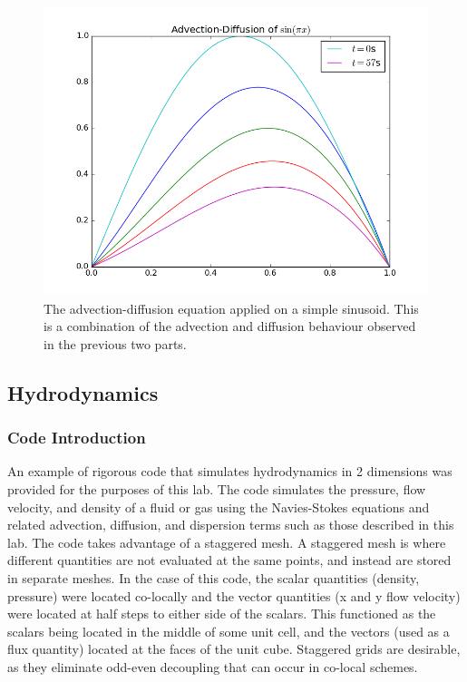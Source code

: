 \documentclass[twocolumn]{article}
\begin{document}
\begin{figure}
	\includegraphics[width=\linewidth]{advection_diffusion.png}
	\caption{
		The advection-diffusion equation applied on a simple
		sinusoid. This is a combination of the advection and diffusion
		behaviour observed in the previous two parts.
	}
	\label{fig:advec_diffuse}
\end{figure}

\subsection{Hydrodynamics}
\subsubsection{Code Introduction}

An example of rigorous code that simulates hydrodynamics in 2 dimensions was provided for the purposes of this lab. The code simulates the pressure, flow velocity, and density of a fluid or gas using the Navies-Stokes equations and related advection, diffusion, and dispersion terms such as those described in this lab. The code takes advantage of a staggered mesh. A staggered mesh is where different quantities are not evaluated at the same points, and instead are stored in separate meshes. In the case of this code, the scalar quantities (density, pressure) were located co-locally and the vector quantities (x and y flow velocity) were located at half steps to either side of the scalars. This functioned as the scalars being located in the middle of some unit cell, and the vectors (used as a flux quantity) located at the faces of the unit cube. Staggered grids are desirable, as they eliminate odd-even decoupling that can occur in co-local schemes.
\end{document}
